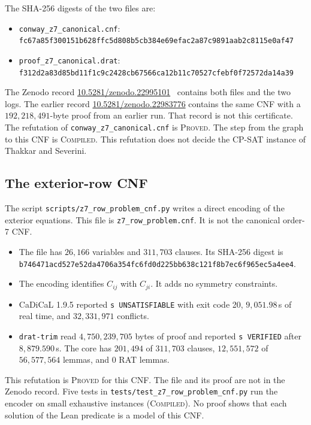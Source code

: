 \documentclass[pdflatex,sn-mathphys-num]{sn-jnl}
\theoremstyle{thmstyleone}
\theoremstyle{thmstyletwo}
\theoremstyle{thmstylethree}
\numberwithin{equation}{section}
\begin{document}
The SHA-256 digests of the two files are:
\begin{itemize}
 \item \texttt{conway\_z7\_canonical.cnf}:\\
   {\footnotesize\texttt{fc67a85f300151b628ffc5d808b5cb384e69efac2a87c9891aab2c8115e0af47}}
 \item \texttt{proof\_z7\_canonical.drat}:\\
   {\footnotesize\texttt{f312d2a83d85bd11f1c9c2428cb67566ca12b11c70527cfebf0f72572da14a39}}
\end{itemize}
The Zenodo record \href{https://doi.org/10.5281/zenodo.22995101}{10.5281/zenodo.22995101}~\cite{conway99_zenodo} contains both files and the two logs. The earlier record \href{https://doi.org/10.5281/zenodo.22983776}{10.5281/zenodo.22983776} contains the same CNF with a $192{,}218{,}491$-byte proof from an earlier run. That record is not this certificate.
The refutation of \texttt{conway\_z7\_canonical.cnf} is \textsc{Proved}. The step from the graph to this CNF is \textsc{Compiled}. This refutation does not decide the CP-SAT instance of Thakkar and Severini.

\subsection{The exterior-row CNF}
\label{sec:exterior_row}

The script \texttt{scripts/z7\_row\_problem\_cnf.py} writes a direct encoding of the exterior equations. This file is \texttt{z7\_row\_problem.cnf}. It is not the canonical order-7 CNF.
\begin{itemize}
 \item The file has $26{,}166$ variables and $311{,}703$ clauses. Its SHA-256 digest is {\footnotesize\texttt{b746471acd527e52da4706a354fc6fd0d225bb638c121f8b7ec6f965ec5a4ee4}}.
 \item The encoding identifies $C_{ij}$ with $C_{ji}$. It adds no symmetry constraints.
 \item CaDiCaL 1.9.5 reported \texttt{s UNSATISFIABLE} with exit code 20, $9{,}051.98$\,s of real time, and $32{,}331{,}971$ conflicts.
 \item \texttt{drat-trim} read $4{,}750{,}239{,}705$ bytes of proof and reported \texttt{s VERIFIED} after $8{,}879.590$\,s. The core has $201{,}494$ of $311{,}703$ clauses, $12{,}551{,}572$ of $56{,}577{,}564$ lemmas, and 0 RAT lemmas.
\end{itemize}
This refutation is \textsc{Proved} for this CNF. The file and its proof are not in the Zenodo record. Five tests in \texttt{tests/test\_z7\_row\_problem\_cnf.py} run the encoder on small exhaustive instances (\textsc{Compiled}). No proof shows that each solution of the Lean predicate is a model of this CNF.
\end{document}
